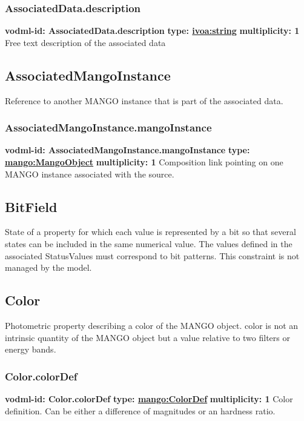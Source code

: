     \subsubsection{AssociatedData.description}
      \textbf{vodml-id: AssociatedData.description} \newline
      \textbf{type: \hyperref[sect:ivoa]{ivoa:string}} \newline
      \textbf{multiplicity: 1} \newline 
      Free text description of the associated data

  \subsection{AssociatedMangoInstance}
  \label{sect:AssociatedMangoInstance}
    Reference to another MANGO instance that is part of the associated data.

    \subsubsection{AssociatedMangoInstance.mangoInstance}
      \textbf{vodml-id: AssociatedMangoInstance.mangoInstance} \newline
      \textbf{type: \hyperref[sect:MangoObject]{mango:MangoObject}} \newline
      \textbf{multiplicity: 1} \newline 
      Composition link pointing on one MANGO instance associated with the source.

  \subsection{BitField}
  \label{sect:BitField}
    State of a property for which each value is represented by a bit so that several states can be included in the same numerical value. The values defined in the associated StatusValues must correspond to bit patterns. This constraint is not managed by the model.

  \subsection{Color}
  \label{sect:Color}
    Photometric property describing a color of the MANGO object. color is not an intrinsic quantity of the MANGO object but a value relative to two filters or energy bands.

    \subsubsection{Color.colorDef}
      \textbf{vodml-id: Color.colorDef} \newline
      \textbf{type: \hyperref[sect:ColorDef]{mango:ColorDef}} \newline
      \textbf{multiplicity: 1} \newline 
      Color definition. Can be either a difference of magnitudes or an hardness ratio.

